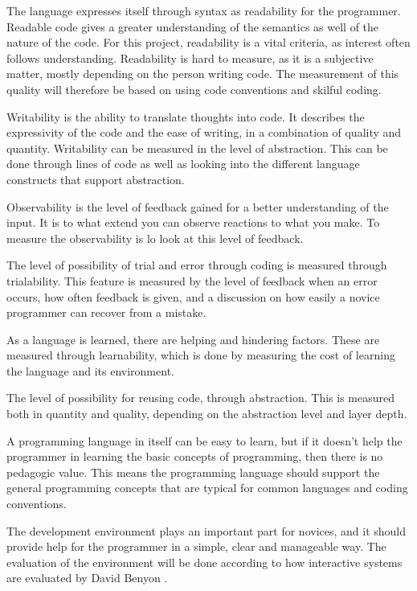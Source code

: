 \begin{description}[style=nextline]
\item[Readability] The language expresses itself through syntax as readability for the programmer. Readable code gives a greater understanding of the semantics as well of the nature of the code. For this project, readability is a vital criteria, as interest often follows understanding. Readability is hard to measure, as it is a subjective matter, mostly depending on the person writing code. The measurement of this quality will therefore be based on using code conventions and skilful coding.
\item[Writability] Writability is the ability to translate thoughts into code. It describes the expressivity of the code and the ease of writing, in a combination of quality and quantity. Writability can be measured in the level of abstraction. This can be done through lines of code as well as looking into the different language constructs that support abstraction.
\item[Observability] Observability is the level of feedback gained for a better understanding of the input. It is to what extend you can observe reactions to what you make. To measure the observability is lo look at this level of feedback.
\item[Trialability] The level of possibility of trial and error through coding is measured through trialability. This feature is measured by the level of feedback when an error occurs, how often feedback is given, and a discussion on how easily a novice programmer can recover from a mistake.
\item[Learnability] As a language is learned, there are helping and hindering factors. These are measured through learnability, which is done by measuring the cost of learning the language and its environment.
\item[Reusability] The level of possibility for reusing code, through abstraction. This is measured both in quantity and quality, depending on the abstraction level and layer depth.
\item[Pedagogic Value] A programming language in itself can be easy to learn, but if it doesn't help the programmer in learning the basic concepts of programming, then there is no pedagogic value. This means the programming language should support the general programming concepts that are typical for common languages and coding conventions.
\item[Environment] The development environment plays an important part for novices, and it should provide help for the programmer in a simple, clear and manageable way. The evaluation of the environment will be done according to how interactive systems are evaluated by David Benyon \cite[p. 225-250]{design_book}.

\end{description}
